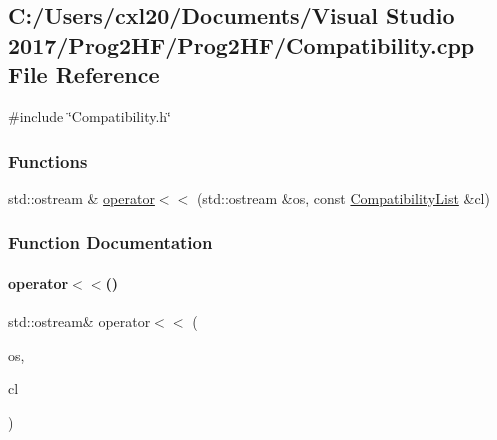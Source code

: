 \subsection{C\+:/\+Users/cxl20/\+Documents/\+Visual Studio 2017/\+Prog2\+H\+F/\+Prog2\+H\+F/\+Compatibility.cpp File Reference}
\label{_compatibility_8cpp}
{\ttfamily \#include \char`\"{}Compatibility.\+h\char`\"{}}\newline
\subsubsection*{Functions}
\begin{DoxyCompactItemize}
\item 
std\+::ostream \& \mbox{\hyperlink{_compatibility_8cpp_a4dba78c90980468354692db49af6847b}{operator$<$$<$}} (std\+::ostream \&os, const \mbox{\hyperlink{class_compatibility_list}{Compatibility\+List}} \&cl)
\end{DoxyCompactItemize}


\subsubsection{Function Documentation}
\mbox{\label{_compatibility_8cpp_a4dba78c90980468354692db49af6847b}} 
\paragraph{\texorpdfstring{operator$<$$<$()}{operator<<()}}
{\footnotesize\ttfamily std\+::ostream\& operator$<$$<$ (\begin{DoxyParamCaption}\item[{std\+::ostream \&}]{os,  }\item[{const \mbox{\hyperlink{class_compatibility_list}{Compatibility\+List}} \&}]{cl }\end{DoxyParamCaption})}

